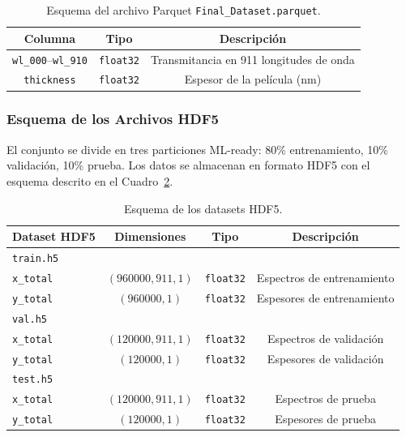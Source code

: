 \documentclass{article}
\begin{document}
\begin{table}[htbp]
\centering
\caption{Esquema del archivo Parquet \texttt{Final\_Dataset.parquet}.}
\label{tab:parquet-schema}
\begin{tabular}{@{}ccc@{}}
\toprule
\textbf{Columna} & \textbf{Tipo} & \textbf{Descripci\'on} \\
\midrule
\texttt{wl\_000}--\texttt{wl\_910} & \texttt{float32} & Transmitancia en 911 longitudes de onda \\
\texttt{thickness} & \texttt{float32} & Espesor de la pel\'icula (nm) \\
\bottomrule
\end{tabular}
\end{table}

\subsubsection{Esquema de los Archivos HDF5}

El conjunto se divide en tres particiones ML-ready: 80\% entrenamiento, 10\% validaci\'on, 10\% prueba. Los datos se almacenan en formato HDF5 con el esquema descrito en el Cuadro~\ref{tab:hdf5-schema}.

\begin{table}[htbp]
\centering
\caption{Esquema de los datasets HDF5.}
\label{tab:hdf5-schema}
\begin{tabular}{@{}lccc@{}}
\toprule
\textbf{Dataset HDF5} & \textbf{Dimensiones} & \textbf{Tipo} & \textbf{Descripci\'on} \\
\midrule
\texttt{train.h5} & & & \\
\quad \texttt{x\_total} & $(960000, 911, 1)$ & \texttt{float32} & Espectros de entrenamiento \\
\quad \texttt{y\_total} & $(960000, 1)$ & \texttt{float32} & Espesores de entrenamiento \\
\texttt{val.h5} & & & \\
\quad \texttt{x\_total} & $(120000, 911, 1)$ & \texttt{float32} & Espectros de validaci\'on \\
\quad \texttt{y\_total} & $(120000, 1)$ & \texttt{float32} & Espesores de validaci\'on \\
\texttt{test.h5} & & & \\
\quad \texttt{x\_total} & $(120000, 911, 1)$ & \texttt{float32} & Espectros de prueba \\
\quad \texttt{y\_total} & $(120000, 1)$ & \texttt{float32} & Espesores de prueba \\
\bottomrule
\end{tabular}
\end{table}
\end{document}
